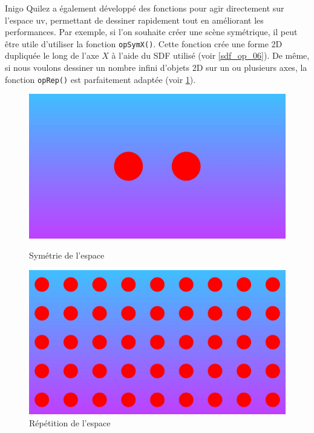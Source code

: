 Inigo Quilez a également développé des fonctions pour agir directement sur l'espace uv, permettant de dessiner rapidement tout en améliorant les performances. Par exemple, si l'on souhaite créer une scène symétrique, il peut être utile d'utiliser la fonction \lstinline{opSymX()}. Cette fonction crée une forme 2D dupliquée le long de l'axe $X$ à l'aide du SDF utilisé (voir \ref{sdf_op_06}). De même, si nous voulons dessiner un nombre infini d'objets 2D sur un ou plusieurs axes, la fonction \lstinline{opRep()} est parfaitement adaptée (voir \ref{sdf_op_07}).

\begin{figure}[h]
  \begin{minipage}[b]{0.45\linewidth}
    \centering
    \includegraphics[width=\linewidth]{images/sdf/sdf_op_06.JPG}
    \caption{Symétrie de l'espace}
    \label{sdf_op_06}
  \end{minipage}
  \hspace{0.1\linewidth} %
  \begin{minipage}[b]{0.45\linewidth}
    \centering
    \includegraphics[width=\linewidth]{images/sdf/sdf_op_07.JPG}
    \caption{Répétition de l'espace}
    \label{sdf_op_07}
  \end{minipage}
\end{figure}

